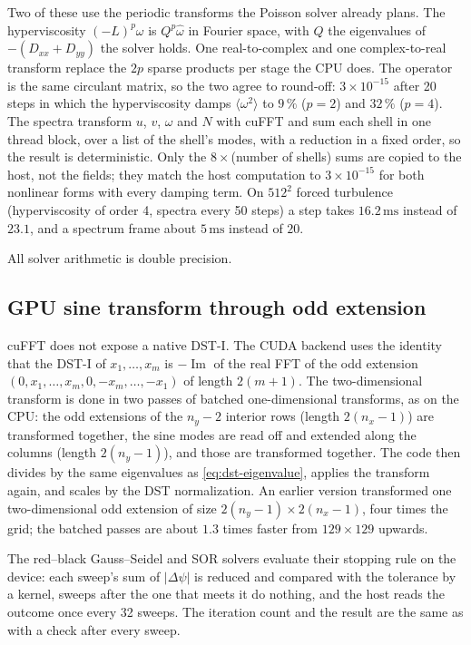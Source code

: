 \documentclass[11pt,a4paper]{article}
\begin{document}
Two of these use the periodic transforms the Poisson solver already plans.  The hyperviscosity $(-L)^p\omega$ is $Q^p\hat\omega$ in Fourier space, with $Q$ the eigenvalues of $-(D_{xx}+D_{yy})$ the solver holds.  One real-to-complex and one complex-to-real transform replace the $2p$ sparse products per stage the CPU does.  The operator is the same circulant matrix, so the two agree to round-off: $3\times10^{-15}$ after 20 steps in which the hyperviscosity damps $\langle\omega^2\rangle$ to $9\,\%$ ($p=2$) and $32\,\%$ ($p=4$).  The spectra transform $u$, $v$, $\omega$ and $N$ with cuFFT and sum each shell in one thread block, over a list of the shell's modes, with a reduction in a fixed order, so the result is deterministic.  Only the $8\times$(number of shells) sums are copied to the host, not the fields; they match the host computation to $3\times10^{-15}$ for both nonlinear forms with every damping term.  On $512^2$ forced turbulence (hyperviscosity of order 4, spectra every 50 steps) a step takes $16.2\,\mathrm{ms}$ instead of $23.1$, and a spectrum frame about $5\,\mathrm{ms}$ instead of $20$.

All solver arithmetic is double precision.

\subsection{GPU sine transform through odd extension}

cuFFT does not expose a native DST-I.  The CUDA backend uses the identity that the DST-I of $x_1,\dots,x_m$ is $-\operatorname{Im}$ of the real FFT of the odd extension $(0,x_1,\dots,x_m,0,-x_m,\dots,-x_1)$ of length $2(m+1)$.  The two-dimensional transform is done in two passes of batched one-dimensional transforms, as on the CPU: the odd extensions of the $n_y-2$ interior rows (length $2(n_x-1)$) are transformed together, the sine modes are read off and extended along the columns (length $2(n_y-1)$), and those are transformed together.  The code then divides by the same eigenvalues as \cref{eq:dst-eigenvalue}, applies the transform again, and scales by the DST normalization.  An earlier version transformed one two-dimensional odd extension of size $2(n_y-1)\times 2(n_x-1)$, four times the grid; the batched passes are about $1.3$ times faster from $129\times129$ upwards.

The red--black Gauss--Seidel and SOR solvers evaluate their stopping rule on the device: each sweep's sum of $|\Delta\psi|$ is reduced and compared with the tolerance by a kernel, sweeps after the one that meets it do nothing, and the host reads the outcome once every 32 sweeps.  The iteration count and the result are the same as with a check after every sweep.
\end{document}
